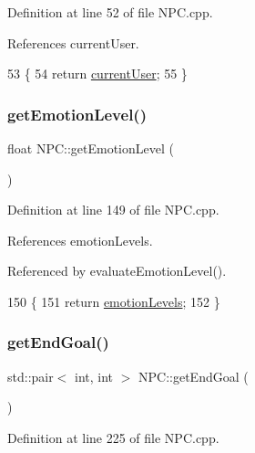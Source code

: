 Definition at line 52 of file N\+P\+C.\+cpp.



References current\+User.


\begin{DoxyCode}
53 \{
54     \textcolor{keywordflow}{return} \hyperlink{class_n_p_c_a944f970943002adc4f0c970b0200c011}{currentUser};
55 \}
\end{DoxyCode}
\mbox{\label{class_n_p_c_a6ee0944f7b8cdf1ab5ab164b3d7074bc}} 
\subsubsection{\texorpdfstring{get\+Emotion\+Level()}{getEmotionLevel()}}
{\footnotesize\ttfamily float N\+P\+C\+::get\+Emotion\+Level (\begin{DoxyParamCaption}{ }\end{DoxyParamCaption})}



Definition at line 149 of file N\+P\+C.\+cpp.



References emotion\+Levels.



Referenced by evaluate\+Emotion\+Level().


\begin{DoxyCode}
150 \{
151     \textcolor{keywordflow}{return} \hyperlink{class_n_p_c_a804b5c812457417231e3b4ab5e06ac88}{emotionLevels};
152 \}
\end{DoxyCode}
\mbox{\label{class_n_p_c_a64a6c85370defc9094cf5e597a7bc85d}} 
\subsubsection{\texorpdfstring{get\+End\+Goal()}{getEndGoal()}}
{\footnotesize\ttfamily std\+::pair$<$ int, int $>$ N\+P\+C\+::get\+End\+Goal (\begin{DoxyParamCaption}{ }\end{DoxyParamCaption})}



Definition at line 225 of file N\+P\+C.\+cpp.



